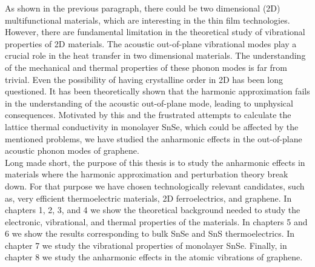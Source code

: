 As shown in the previous paragraph, there could be two dimensional (2D) multifunctional materials, which are 
interesting in the thin film technologies. However, there are fundamental limitation in the theoretical study of 
vibrational properties of 2D materials. The acoustic out-of-plane vibrational modes play a crucial 
role\cite{lindsay2010flexural} in the heat transfer in two dimensional materials. The understanding of the mechanical and thermal properties of these phonon modes is far from trivial. Even the possibility of having crystalline order 
in 2D has been long questioned\cite{landau_statistical_physics,mermin1968crystalline}. It has been theoretically 
shown that the harmonic approximation fails\cite{katsnelson2013graphene} in the understanding of the acoustic 
out-of-plane mode, leading to unphysical consequences. Motivated by this and the frustrated attempts to calculate 
the lattice thermal conductivity in monolayer SnSe, which could be affected by the mentioned problems, we have 
studied the anharmonic effects in the out-of-plane acoustic phonon modes of graphene. \\

Long made short, the purpose of this thesis is to study the anharmonic effects in materials where the harmonic 
approximation and perturbation theory break down. For that purpose we have chosen technologically relevant 
candidates, such as, very efficient thermoelectric materials, 2D ferroelectrics, and graphene. In chapters 1, 2, 3, 
and 4 we show the theoretical background needed to study the electronic, vibrational, and thermal properties of the 
materials. In chapters 5 and 6 we show the results corresponding to bulk SnSe and SnS thermoelectrics. In chapter 7 
we study the vibrational properties of monolayer SnSe. Finally, in chapter 8 we study the anharmonic effects in the 
atomic vibrations of graphene. 
